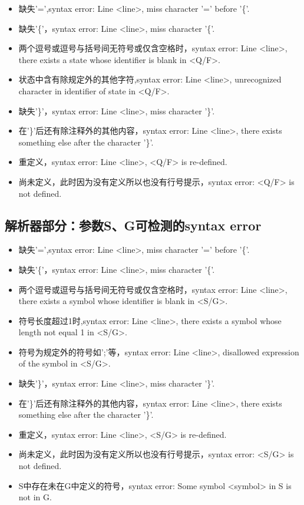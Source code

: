 \documentclass[UTF8]{article}
\begin{document}
\begin{itemize}
    \item 缺失'=',syntax error: Line <line>, miss character '=' before '\{'.  
    \item 缺失'\{'，syntax error: Line <line>, miss character '\{'.  
    \item 两个逗号或逗号与括号间无符号或仅含空格时，syntax error: Line <line>, there exists a state whose identifier is blank in <Q/F>.
	\item 状态中含有除规定外的其他字符,syntax error: Line <line>, unrecognized character in identifier of state in <Q/F>. 
    \item 缺失'\}'，syntax error: Line <line>, miss character '\}'.
    \item 在'\}'后还有除注释外的其他内容，syntax error: Line <line>, there exists something else after the character '\}'.
	\item 重定义，syntax error: Line <line>, <Q/F>  is re-defined.
    \item 尚未定义，此时因为没有定义所以也没有行号提示，syntax error: <Q/F> is not defined.
\end{itemize}

\subsection{解析器部分：参数S、G可检测的syntax error}
\begin{itemize}
    \item 缺失'=',syntax error: Line <line>, miss character '=' before '\{'.  
    \item 缺失'\{'，syntax error: Line <line>, miss character '\{'.  
    \item 两个逗号或逗号与括号间无符号或仅含空格时，syntax error: Line <line>, there exists a symbol whose identifier is blank in <S/G>.
	\item 符号长度超过1时,syntax error: Line <line>, there exists a symbol whose length not equal 1 in <S/G>.
	\item 符号为规定外的符号如';'等，syntax error: Line <line>, disallowed expression of the symbol in <S/G>.
    \item 缺失'\}'，syntax error: Line <line>, miss character '\}'.
    \item 在'\}'后还有除注释外的其他内容，syntax error: Line <line>, there exists something else after the character '\}'.
	\item 重定义，syntax error: Line <line>, <S/G>  is re-defined.
    \item 尚未定义，此时因为没有定义所以也没有行号提示，syntax error: <S/G> is not defined.
	\item S中存在未在G中定义的符号，syntax error: Some symbol <symbol> in S is not in G.
\end{itemize}
\end{document}
